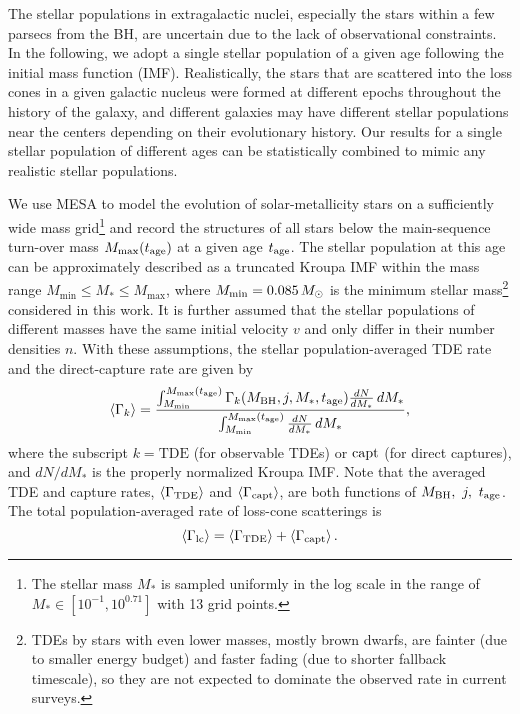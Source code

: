 \documentclass[useAMS,usenatbib]{mn2e}
\def\mr{\mathrm}
\def\msun{M_{\rm \odot}}
\def\mstar{M_*}
\def\mBH{M_{\rm BH}}
\def\GammaTDE{\Gamma_{\rm TDE}}
\def\Gammacapt{\Gamma_{\rm capt}}
\def\Gammalc{\Gamma_{\rm lc}}
\def\tage{t_{\rm age}}
\newcommand{\lara}[1]{\left\langle{#1}\right\rangle}
\begin{document}
The stellar populations in extragalactic nuclei, especially the stars within a few parsecs from the BH, are uncertain due to the lack of observational constraints. In the following, we adopt a single stellar population of a given age following the \citet{Kroupa2001} initial mass function (IMF). Realistically, the stars that are scattered into the loss cones in a given galactic nucleus were formed at different epochs throughout the history of the galaxy, and different galaxies may have different stellar populations near the centers depending on their evolutionary history. Our results for a single stellar population of different ages can be statistically combined to mimic any realistic stellar populations.

We use MESA to model the evolution of solar-metallicity stars on a sufficiently wide mass grid\footnote{The stellar mass $M_*$ is sampled uniformly in the log scale in the range of $M_*\in[10^{-1},10^{0.71}]$ with 13 grid points.} and record the structures of all stars below the main-sequence turn-over mass $M_{\rm max}(t_{\rm age})$ at a given age $t_{\rm age}$.
The stellar population at this age can be approximately described as a truncated Kroupa IMF within the mass range $M_{\min}\le\mstar\le M_{\max}$, where $M_{\min}=0.085\,\msun$ is the minimum stellar mass\footnote{TDEs by stars with even lower masses, mostly brown dwarfs, are fainter (due to smaller energy budget) and faster fading (due to shorter fallback timescale), so they are not expected to dominate the observed rate in current surveys. } considered in this work. It is further assumed that the stellar populations of different masses have the same initial velocity $v$ and only differ in their number densities $n$. With these assumptions, the stellar population-averaged TDE rate and the direct-capture rate are given by
\begin{align}
    \lara{\Gamma_{k}} =  \frac{\int_{M_{\min}}^{M_{\max}(\tage)}\Gamma_{k}(\mBH,j,\mstar,\tage)\frac{dN}{d\mstar}\,d\mstar}{\int_{M_{\min}}^{M_{\max}(\tage)}\frac{dN}{d\mstar}\,d\mstar},
\end{align}
where the subscript $k=\mr{TDE}$ (for observable TDEs) or $\rm{capt}$ (for direct captures), and $dN/d\mstar$ is the properly normalized Kroupa IMF. Note that the averaged TDE and capture rates, $\lara{\GammaTDE}$ and $\lara{\Gammacapt}$, are both functions of $\mBH,\ j,\ \tage$. The total population-averaged rate of loss-cone scatterings is
\begin{equation}
    \lara{\Gammalc} = \lara{\GammaTDE} + \lara{\Gammacapt}.
\end{equation}
\end{document}
